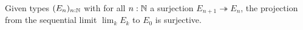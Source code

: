 \begin{axiomNum}\label{axDependentChoice}
Given types $(E_n)_{n:\mathbb{N}}$ with for all $n:\mathbb{N}$ a surjection $E_{n+1}\twoheadrightarrow E_n$, the projection from the sequential limit $\lim_kE_k$ to $E_0$ is surjective.
\end{axiomNum}
